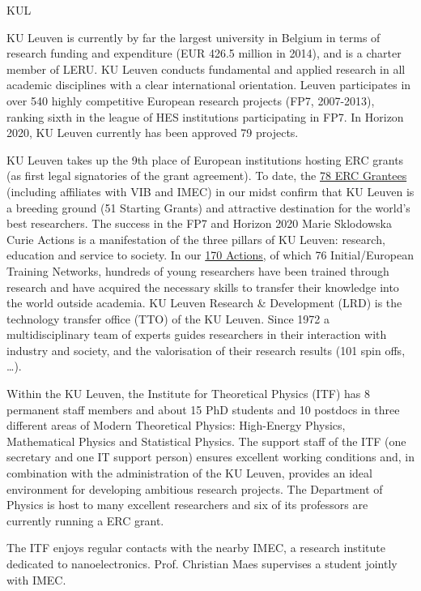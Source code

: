 \begin{sitedescription}{KUL} \label{desc:KUL}

KU Leuven is currently by far the largest university in Belgium in terms of
research funding and expenditure (EUR 426.5 million in 2014), and is a charter
member of LERU. KU Leuven conducts fundamental and applied research in all
academic disciplines with a clear international orientation.  Leuven
participates in over 540 highly competitive European research projects (FP7,
2007-2013), ranking sixth in the league of HES institutions participating in
FP7. In Horizon 2020, KU Leuven currently has been approved 79 projects.

KU Leuven takes up the 9th place of European institutions hosting ERC grants (as
first legal signatories of the grant agreement). To date, the
\href{http://www.kuleuven.be/english/research/EU/p/erc}{78 ERC Grantees}
(including affiliates with VIB and IMEC) in our midst confirm that KU Leuven is
a breeding ground (51 Starting Grants) and attractive destination for the
world's best researchers. The success in the FP7 and Horizon 2020 Marie
Sklodowska Curie Actions is a manifestation of the three pillars of KU Leuven:
research, education and service to society. In our
\href{http://www.kuleuven.be/english/research/EU/p/horizon2020/es/msca}{170
Actions}, of which 76 Initial/European Training Networks, hundreds of young
researchers have been trained through research and have acquired the necessary
skills to transfer their knowledge into the world outside academia.
%
KU Leuven Research \& Development (LRD) is the technology
transfer office (TTO) of the KU Leuven. Since 1972 a multidisciplinary team of
experts guides researchers in their interaction with industry and society, and
the valorisation of their research results (101 spin offs, \dots).

Within the KU Leuven, the Institute for Theoretical Physics (ITF) has 8 permanent staff
members and about 15 PhD students and 10 postdocs in three different areas of Modern
Theoretical Physics: High-Energy Physics, Mathematical Physics and Statistical Physics.
%
The support staff of the ITF (one secretary and one IT support person) ensures excellent
working conditions and, in combination with the administration of the KU Leuven, provides an
ideal environment for developing ambitious research projects.
%
The Department of Physics is host to many excellent researchers and six of its professors
are currently running a ERC grant.

The ITF enjoys regular contacts with the nearby IMEC, a research institute dedicated to
nanoelectronics. Prof. Christian Maes supervises a student jointly with IMEC.


\end{sitedescription}
